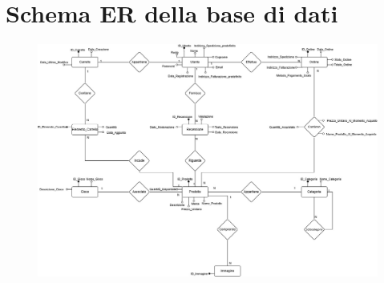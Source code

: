 \documentclass[14pt]{extreport}
\begin{document}
\chapter{Schema ER della base di dati}
\begin{figure}[h!]
    \centering
    \includegraphics[width=1.1\textwidth]{cardHaven.jpg}
\end{figure}
\end{document}
